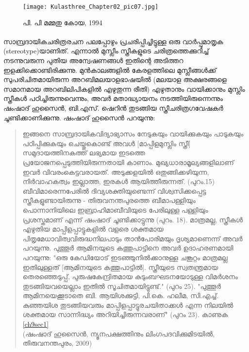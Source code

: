\begin{figure}[h]
\begin{center}
\texttt{[image: Kulasthree\_Chapter02\_pic07.jpg]}
\end{center}
\caption*{പി. പി മമ്മതു കോയ, 1994}
\end{figure}

\label{ch2box5} %
\begin{tcolorbox}[%
  breakable, %
  arc=0mm, 
  left=1pt, right = 1pt, 
  boxrule=0mm,
  colback = {blue!10}, %
] 

\paragraph{} സാമ്പ്രദായികചരിത്രരചന പലപ്പോഴും പ്രചരിപ്പിച്ചിട്ടുള്ള ഒരു വാർപ്പുമാതൃക (stereotype)യാണിത്. എന്നാൽ മുസ്ലീം സ്ത്രീകളുടെ ചരിത്രത്തെക്കുറിച്ച് നടന്നുവരുന്ന പുതിയ അന്വേഷണങ്ങൾ ഇതിന്റെ അടിത്തറ ഇളക്കിക്കൊണ്ടിരിക്കുന്നു. മുൻകാലങ്ങളിൽ കേരളത്തിലെ മുസ്ലീങ്ങൾക്ക് സുപരിചിതമായിരുന്ന അറബിമലയാളഭാഷയിൽ (മലയാള അക്ഷരങ്ങളെ സമാനമായ അറബിലിപികളിൽ എഴുതുന്ന രീതി) എഴുതാനും വായിക്കാനും മുസ്ലിം സ്ത്രീകൾ പഠിച്ചിരുന്നുവെന്നും, അവർ മതാദ്ധ്യായനം നടത്തിയിരുന്നെന്നും ഷംഷാദ് ഹുസൈൻ, ബി.എസ്. ഷെറിൻ തുടങ്ങിയ സ്ത്രീചരിത്രഗവേഷകർ ചൂണ്ടിക്കാണിക്കുന്നു. ഷംഷാദ് ഹുസൈൻ പറയുന്നു:

\begin{quotation}
ഇങ്ങനെ സാമ്പ്രദായികവിദ്യാഭ്യാസം നേടുകയും വായിക്കുകയും പാടുകയും പഠിപ്പിക്കുകയും ചെയ്തുകൊണ്ട് അവൾ [മാപ്പിളമുസ്ലിം സ്ത്രീ] സമുദായത്തിനകത്ത് ലഭ്യമായ ഇടത്തെ പ്രയോജനപ്പെടുത്തിയിരുന്നതായി കാണാം. മുഖ്യധാരാമൂല്യങ്ങളിലാണ് ഇവർ വിവരംകെട്ടവരായത്. അടുക്കളയിൽ ഒതുങ്ങിക്കഴിയുന്ന, നിർവാഹകത്വം ഇല്ലാത്ത, ഇരകൾ ആയിത്തീരുന്നത്. (പുറം.15) ബീവിമാരെന്നപേരിൽ ദിവ്യശക്തിയുണ്ടെന്ന് വിശ്വസിക്കപ്പെട്ട സ്ത്രീകളുണ്ടായിരുന്നു - തിരുവനന്തപുരത്തെ ബീമാപള്ളിയും പൊന്നാനിയിലെ ഇബ്രാഹിമാബീവിയുടെ പേരിലുള്ള പള്ളിയും പ്രശസ്തമാണ് എന്ന് ഷംഷാദ് ചൂണ്ടിക്കാട്ടുന്നു (പുറം. 18). മാത്രമല്ല, സ്ത്രീകൾ എഴുതിയ മാപ്പിളപ്പാട്ടുകളിൽ വളരെ ശക്തമായ പിതൃമേധാവിത്വവിരുദ്ധനിലപാടും താൻപോരിമയും ദൃശ്യമാണെന്ന് അവർ പറയുന്നു. പുത്തൂർ ആമിനയുടെ കത്തുപാട്ടിനെ അവർ ഉദാഹരണമായി പറയുന്നു: "ഒരു കേഡിയോട് ഇടഞ്ഞുനിൽക്കാനുള്ള ചങ്കൂറ്റം മാത്രമല്ല ഇതിലുള്ളത് [ആമിനയുടെ കത്തുപാട്ടിൽ]. സ്ത്രീയുടെ സ്വതന്ത്രമായ തെരഞ്ഞെടുപ്പ്, പുരുഷകേന്ദ്രിതമായ കുടുംബഘടനയോടുള്ള വിമർശനം തുടങ്ങിയവയെല്ലാം ഇതിൽ സൂചിതമായിട്ടുണ്ട്." (പുറം 25). "പുത്തൂർ ആമിനയെക്കൂടാതെ ബി. ആയിശക്കുട്ടി, പി.കെ. ഹലീമ, സി.എച്ച്. കുഞ്ഞയിശ തുടങ്ങിയവരും മാപ്പിളപ്പാട്ടുരചയിതാക്കൾ എന്ന നിലയിൽ ശക്തമായ സാന്നിദ്ധ്യം അറിയിച്ചിരുന്നവരാണ്" (പുറം 23). കാണുക \ref{ch9sec1} \\
(ഷംഷാദ് ഹുസൈൻ, ന്യൂനപക്ഷത്തിനും ലിംഗപദവിക്കുമിടയിൽ, തിരുവനന്തപുരം, 2009)

\end{quotation}
\end{tcolorbox}

